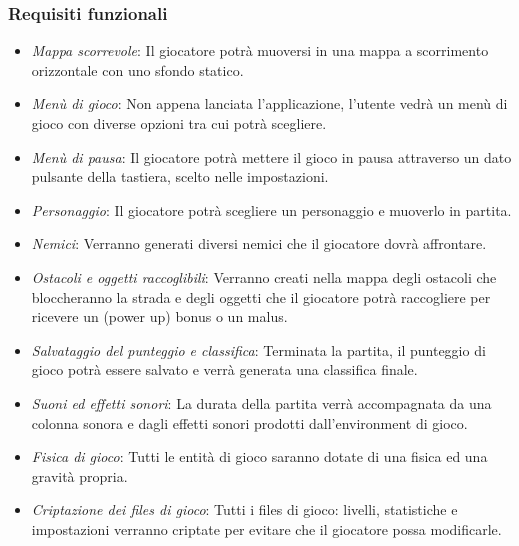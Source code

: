 \subsubsection{Requisiti funzionali}

\begin{itemize}
	\item \textsf{\small \emph{Mappa scorrevole}: Il giocatore potrà muoversi in una mappa a scorrimento orizzontale con uno sfondo statico.}
	\item \textsf{\small \emph{Menù di gioco}: Non appena lanciata l'applicazione, l'utente vedrà un menù di gioco con diverse opzioni tra cui potrà scegliere.}
	\item \textsf{\small \emph{Menù di pausa}: Il giocatore potrà mettere il gioco in pausa attraverso un dato pulsante della tastiera, scelto nelle impostazioni.}
	\item \textsf{\small \emph{Personaggio}: Il giocatore potrà scegliere un personaggio e muoverlo in partita.}
	\item \textsf{\small \emph{Nemici}: Verranno generati diversi nemici che il giocatore dovrà affrontare.}
	\item \textsf{\small \emph{Ostacoli e oggetti raccoglibili}: Verranno creati nella mappa degli ostacoli che bloccheranno la strada e degli oggetti che il giocatore potrà raccogliere per ricevere un (power up) bonus o un malus.}
	\item \textsf{\small \emph{Salvataggio del punteggio e classifica}: Terminata la partita, il punteggio di gioco potrà essere salvato e verrà generata una classifica finale.}
	\item \textsf{\small \emph{Suoni ed effetti sonori}: La durata della partita verrà accompagnata da una colonna sonora e dagli effetti sonori prodotti dall'environment di gioco.}
	\item \textsf{\small \emph{Fisica di gioco}: Tutti le entità di gioco saranno dotate di una fisica ed una gravità propria.}
	\item \textsf{\small \emph{Criptazione dei files di gioco}: Tutti i files di gioco: livelli, statistiche e impostazioni verranno criptate per evitare che il giocatore possa modificarle.}
\end{itemize}


